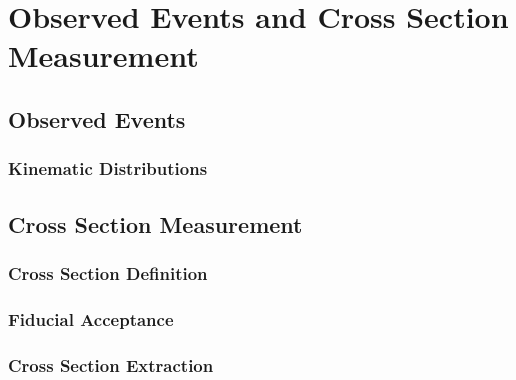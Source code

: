 \graphicspath{{Chapters/CrossSection/Figures/}}
\chapter{Observed Events and Cross Section Measurement}
\label{chap:Cross Section Measurements}

\section{Observed Events}
\subsection{Kinematic Distributions}

\section{Cross Section Measurement}
\subsection{Cross Section Definition}
\subsection{Fiducial Acceptance}
\subsection{Cross Section Extraction}
